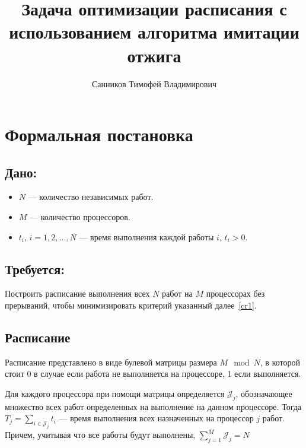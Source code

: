\documentclass[openany, twoside, a4paper, 12pt]{extbook}
\title{Задача оптимизации расписания с использованием алгоритма имитации отжига}
\author{Санников Тимофей Владимирович}
\begin{document}
	\maketitle
	\section*{Формальная постановка}
	\subsection*{Дано:}
	
	\begin{itemize}
	    \item \( N \) — количество независимых работ.
	    \item \( M \) — количество процессоров.
	    \item \( t_i \), \( i = 1, 2, \dots, N \) — время выполнения каждой работы \( i \), \( t_i > 0 \).
	\end{itemize}
	
	\subsection*{Требуется:}
	
	Построить расписание выполнения всех
	\( N \) работ на \( M \) процессорах без прерываний,
	чтобы минимизировать критерий указанный далее~\ref{cr1}.


	\subsection*{Расписание}

	Расписание представлено в виде булевой матрицы размера $ M \mod N $,
	в которой стоит 0 в случае если работа не выполняется на процессоре,
	1 если выполняется.

	Для каждого процессора при помощи матрицы определяется $ \mathcal{J}_j $,
	обозначающее множество всех работ определенных на выполнение на данном процессоре.
	Тогда $ T_j = \sum_{i \in \mathcal{J}_j} t_i $ --- время выполнения всех назначенных на процессор \( j \) работ.
	Причем, учитывая что все работы будут выполнены, $ \sum_{j=1}^{M} \mathcal{J}_j = N$
\end{document}
